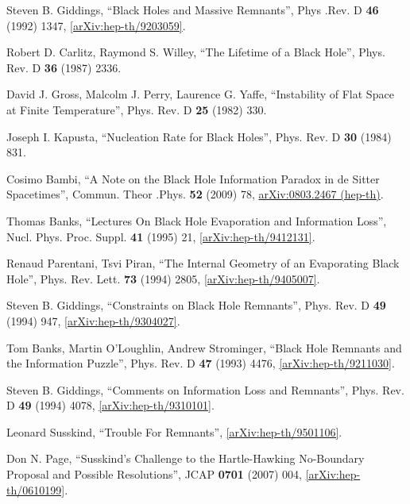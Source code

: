 \documentclass[12pt]{article}
\newcommand{\2}{$^2$}
\newcommand{\3}{$^3$}
\newcommand{\4}{$_4$}
\newcommand{\5}{$_5$}
\begin{document}
\begin{thebibliography}{400}
 Steven B. Giddings, ``Black Holes and Massive Remnants'', Phys .Rev. D \textbf{46} (1992) 1347, \href{http://arxiv.org/abs/hep-th/9203059}{[arXiv:hep-th/9203059]}.

Robert D. Carlitz, Raymond S. Willey, ``The Lifetime of a Black Hole'', Phys. Rev. D \textbf{36} (1987) 2336.

David J. Gross, Malcolm J. Perry, Laurence G. Yaffe, ``Instability of Flat Space at Finite Temperature'', Phys. Rev. D \textbf{25} (1982) 330.

Joseph I. Kapusta, ``Nucleation Rate for Black Holes'', Phys. Rev. D \textbf{30} (1984) 831.  

Cosimo Bambi, ``A Note on the Black Hole Information Paradox in de Sitter Spacetimes'', 	Commun. Theor .Phys. \textbf{52} (2009) 78, \href{http://arxiv.org/abs/0803.2467}{arXiv:0803.2467 (hep-th)}.

 Thomas Banks, ``Lectures On Black Hole Evaporation and Information Loss'', Nucl. Phys. Proc. Suppl. \textbf{41} (1995) 21, \href{http://arxiv.org/abs/hep-th/9412131}{[arXiv:hep-th/9412131]}.

Renaud Parentani, Tsvi Piran, ``The Internal Geometry of an Evaporating Black Hole'', Phys. Rev. Lett. \textbf{73} (1994) 2805, \href{http://arxiv.org/abs/hep-th/9405007v2}{[arXiv:hep-th/9405007]}.


 Steven B. Giddings, ``Constraints on Black Hole Remnants'', Phys. Rev. D \textbf{49} (1994) 947, \href{http://arxiv.org/abs/hep-th/9304027}{[arXiv:hep-th/9304027]}.


Tom Banks, Martin O'Loughlin, Andrew Strominger, ``Black Hole Remnants and the Information Puzzle'', Phys. Rev. D \textbf{47} (1993) 4476, \href{http://arxiv.org/abs/hep-th/9211030}{[arXiv:hep-th/9211030]}. 

Steven B. Giddings, ``Comments on Information Loss and Remnants'', Phys. Rev. D \textbf{49} (1994) 4078, \href{http://arxiv.org/abs/hep-th/9310101}{[arXiv:hep-th/9310101]}.

Leonard Susskind, ``Trouble For Remnants'', \href{http://arxiv.org/abs/hep-th/9501106v1}{[arXiv:hep-th/9501106]}. 

Don N. Page, ``Susskind's Challenge to the Hartle-Hawking No-Boundary Proposal and Possible Resolutions'', JCAP \textbf{0701} (2007) 004, \href{http://arxiv.org/abs/hep-th/0610199}{[arXiv:hep-th/0610199]}.


\end{thebibliography}
\end{document}
